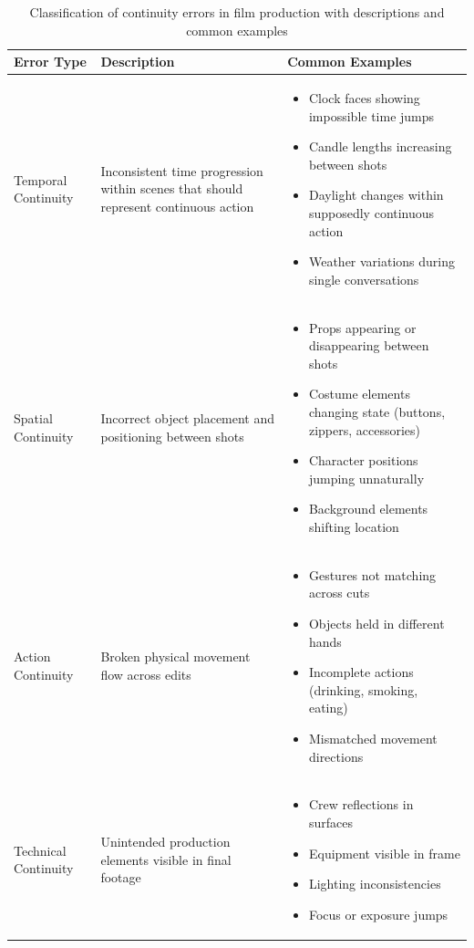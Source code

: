 \begin{table}[h]
\centering
\begin{tabularx}{\textwidth}{|l|X|X|}
\hline
\textbf{Error Type} & \textbf{Description} & \textbf{Common Examples} \\
\hline
Temporal Continuity & Inconsistent time progression within scenes that should represent continuous action & 
\begin{itemize}[nosep,leftmargin=*]
\item Clock faces showing impossible time jumps
\item Candle lengths increasing between shots
\item Daylight changes within supposedly continuous action
\item Weather variations during single conversations
\end{itemize} \\
\hline
Spatial Continuity & Incorrect object placement and positioning between shots & 
\begin{itemize}[nosep,leftmargin=*]
\item Props appearing or disappearing between shots
\item Costume elements changing state (buttons, zippers, accessories)
\item Character positions jumping unnaturally
\item Background elements shifting location
\end{itemize} \\
\hline
Action Continuity & Broken physical movement flow across edits & 
\begin{itemize}[nosep,leftmargin=*]
\item Gestures not matching across cuts
\item Objects held in different hands
\item Incomplete actions (drinking, smoking, eating)
\item Mismatched movement directions
\end{itemize} \\
\hline
Technical Continuity & Unintended production elements visible in final footage & 
\begin{itemize}[nosep,leftmargin=*]
\item Crew reflections in surfaces
\item Equipment visible in frame
\item Lighting inconsistencies
\item Focus or exposure jumps
\end{itemize} \\
\hline
\end{tabularx}
\caption{Classification of continuity errors in film production with descriptions and common examples}
\label{tab:continuity-errors}
\end{table}

